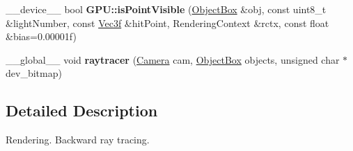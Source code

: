 \begin{DoxyCompactItemize}
\item 
\+\_\+\+\_\+device\+\_\+\+\_\+ bool {\bfseries G\+P\+U\+::is\+Point\+Visible} (\hyperlink{class_object_box}{Object\+Box} \&obj, const uint8\+\_\+t \&light\+Number, const \hyperlink{class_vec3}{Vec3f} \&hit\+Point, Rendering\+Context \&rctx, const float \&bias=0.\+00001f)\hypertarget{rendering_8cuh_adcb3e0c7119489d0f49d385c771df604}{}\label{rendering_8cuh_adcb3e0c7119489d0f49d385c771df604}

\item 
\+\_\+\+\_\+global\+\_\+\+\_\+ void {\bfseries raytracer} (\hyperlink{struct_camera}{Camera} cam, \hyperlink{class_object_box}{Object\+Box} objects, unsigned char $\ast$dev\+\_\+bitmap)
\end{DoxyCompactItemize}


\subsection{Detailed Description}
Rendering. Backward ray tracing. 

